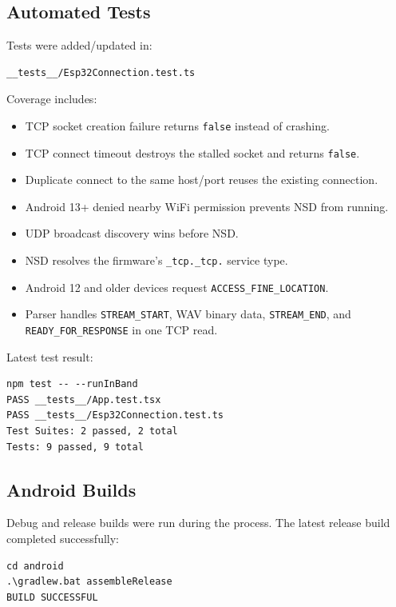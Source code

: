 \documentclass[11pt,a4paper]{article}
\begin{document}
\subsection{Automated Tests}

Tests were added/updated in:

\begin{lstlisting}[style=logstyle]
__tests__/Esp32Connection.test.ts
\end{lstlisting}

Coverage includes:

\begin{itemize}[leftmargin=*]
  \item TCP socket creation failure returns \texttt{false} instead of crashing.
  \item TCP connect timeout destroys the stalled socket and returns \texttt{false}.
  \item Duplicate connect to the same host/port reuses the existing connection.
  \item Android 13+ denied nearby WiFi permission prevents NSD from running.
  \item UDP broadcast discovery wins before NSD.
  \item NSD resolves the firmware's \texttt{\_tcp.\_tcp.} service type.
  \item Android 12 and older devices request \texttt{ACCESS\_FINE\_LOCATION}.
  \item Parser handles \texttt{STREAM\_START}, WAV binary data, \texttt{STREAM\_END}, and \texttt{READY\_FOR\_RESPONSE} in one TCP read.
\end{itemize}

Latest test result:

\begin{lstlisting}[style=logstyle]
npm test -- --runInBand
PASS __tests__/App.test.tsx
PASS __tests__/Esp32Connection.test.ts
Test Suites: 2 passed, 2 total
Tests: 9 passed, 9 total
\end{lstlisting}

\subsection{Android Builds}

Debug and release builds were run during the process. The latest release build completed successfully:

\begin{lstlisting}[style=logstyle]
cd android
.\gradlew.bat assembleRelease
BUILD SUCCESSFUL
\end{lstlisting}
\end{document}
